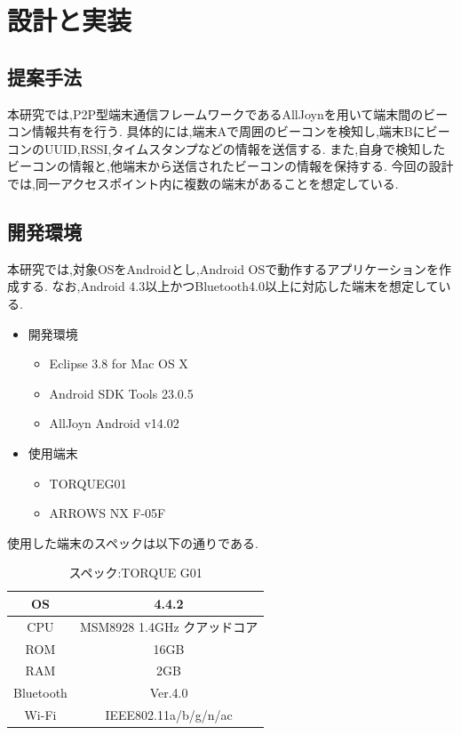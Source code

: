 \chapter{設計と実装}
\label{chap:poordirection}

\section{提案手法}
本研究では,P2P型端末通信フレームワークであるAllJoynを用いて端末間のビーコン情報共有を行う.
具体的には,端末Aで周囲のビーコンを検知し,端末BにビーコンのUUID,RSSI,タイムスタンプなどの情報を送信する.
また,自身で検知したビーコンの情報と,他端末から送信されたビーコンの情報を保持する.
今回の設計では,同一アクセスポイント内に複数の端末があることを想定している.

\section{開発環境}
本研究では,対象OSをAndroidとし,Android OSで動作するアプリケーションを作成する.
なお,Android 4.3以上かつBluetooth4.0以上に対応した端末を想定している.
\begin{itemize}
\item 開発環境
\begin{itemize}
\item Eclipse 3.8 for Mac OS X
\item Android SDK Tools 23.0.5
\item AllJoyn Android v14.02
\end{itemize}
\item 使用端末
\begin{itemize}
\item TORQUEG01
\item ARROWS NX F-05F
\end{itemize}
\end{itemize}

使用した端末のスペックは以下の通りである.
\begin{table}[htbp]
\centering
\begin{tabular}{|c|c|} \hline
OS &  4.4.2 \\ \hline
CPU & MSM8928 1.4GHz クアッドコア \\ \hline
ROM & 16GB \\ \hline
RAM & 2GB \\ \hline
Bluetooth & Ver.4.0 \\ \hline
Wi-Fi & IEEE802.11a/b/g/n/ac \\ \hline
\end{tabular}
\caption{スペック:TORQUE G01}
\end{table}

